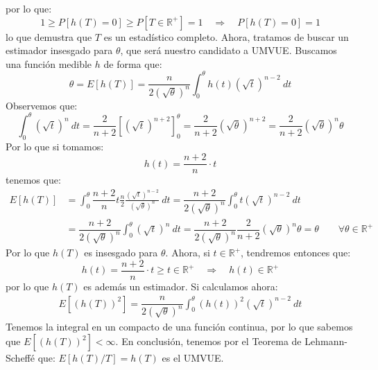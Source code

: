 \begin{ejercicio}
    por lo que:
    \begin{equation*}
        1 \geq P[h(T) = 0] \geq P[T\in \mathbb{R}^+] = 1 \quad \Longrightarrow \quad P[h(T)=0] = 1
    \end{equation*}
    lo que demustra que $T$ es un estadístico completo. Ahora, tratamos de buscar un estimador insesgado para $\theta$, que será nuestro candidato a UMVUE. Buscamos una función medible $h$ de forma que:
    \begin{equation*}
        \theta = E[h(T)] = \dfrac{n}{2{\left(\sqrt{\theta}\right)}^{n}}\int_{0}^{\theta} h(t){\left(\sqrt{t}\right)}^{n-2}~dt 
    \end{equation*} 
    Observemos que:
    \begin{equation*}
        \int_{0}^{\theta}{\left(\sqrt{t}\right)}^{n} ~dt  = \dfrac{2}{n+2}\left[{\left(\sqrt{t}\right)}^{n+2}\right]_0^\theta = \dfrac{2}{n+2}{\left(\sqrt{\theta}\right)}^{n+2} = \dfrac{2}{n+2}{\left(\sqrt{\theta}\right)}^{n}\theta
    \end{equation*}
    Por lo que si tomamos:
    \begin{equation*}
        h(t) = \dfrac{n+2}{n} \cdot t
    \end{equation*}
    tenemos que:
    \begin{align*}
        E[h(T)] &= \int_{0}^{\theta} \dfrac{n+2}{n}t\frac{n}{2}\frac{{\left(\sqrt{t}\right)}^{n-2}}{{\left(\sqrt{\theta}\right)}^{n}}~dt  = \dfrac{n+2}{2{\left(\sqrt{\theta}\right)}^{n}} \int_{0}^{\theta}t{\left(\sqrt{t}\right)}^{n-2} ~dt  \\
                &= \dfrac{n+2}{2{\left(\sqrt{\theta}\right)}^{n}} \int_{0}^{\theta}{\left(\sqrt{t}\right)}^{n} ~dt   = \dfrac{n+2}{2{\left(\sqrt{\theta}\right)}^{n}} \dfrac{2}{n+2}{\left(\sqrt{\theta}\right)}^{n}\theta  = \theta \qquad \forall \theta\in \mathbb{R}^+
    \end{align*}
    Por lo que $h(T)$ es insesgado para $\theta$. Ahora, si $t\in \mathbb{R}^+$, tendremos entonces que:
    \begin{equation*}
        h(t) = \dfrac{n+2}{n}\cdot t \geq t \in \mathbb{R}^+ \quad  \Longrightarrow \quad  h(t) \in \mathbb{R}^+
    \end{equation*}
    por lo que $h(T)$ es además un estimador. Si calculamos ahora:
    \begin{align*}
        E\left[{(h(T))}^{2}\right] = \dfrac{n}{2{\left(\sqrt{\theta}\right)}^{n}} \int_{0}^{\theta} {(h(t))}^{2}{(\sqrt{t})}^{n-2}~dt 
    \end{align*}
    Tenemos la integral en un compacto de una función continua, por lo que sabemos que $E[{(h(T))}^{2}]<\infty$. En conclusión, tenemos por el Teorema de Lehmann-Scheffé que: $E[h(T)/T] = h(T)$ es el UMVUE.
\end{ejercicio}

